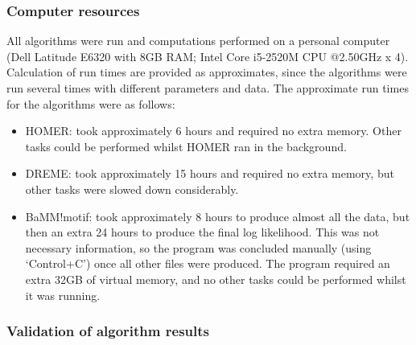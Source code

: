 \documentclass[12pt]{article}
\begin{document}
\subsubsection{Computer resources}

All algorithms were run and computations performed on a personal computer (Dell Latitude E6320 with 8GB RAM; Intel Core i5-2520M CPU @2.50GHz x 4). Calculation of run times are provided as approximates, since the algorithms were run several times with different parameters and data. The approximate run times for the algorithms were as follows:
\begin{itemize}
\item HOMER: took approximately 6 hours and required no extra memory. Other tasks could be performed whilst HOMER ran in the background.
\item DREME: took approximately 15 hours and required no extra memory, but other tasks were slowed down considerably.
\item BaMM!motif: took approximately 8 hours to produce almost all the data, but then an extra 24 hours to produce the final log likelihood. This was not necessary information, so the program was concluded manually (using `Control+C') once all other files were produced. The program required an extra 32GB of virtual memory, and no other tasks could be performed whilst it was running.
\end{itemize}


\subsubsection{Validation of algorithm results}
\end{document}
